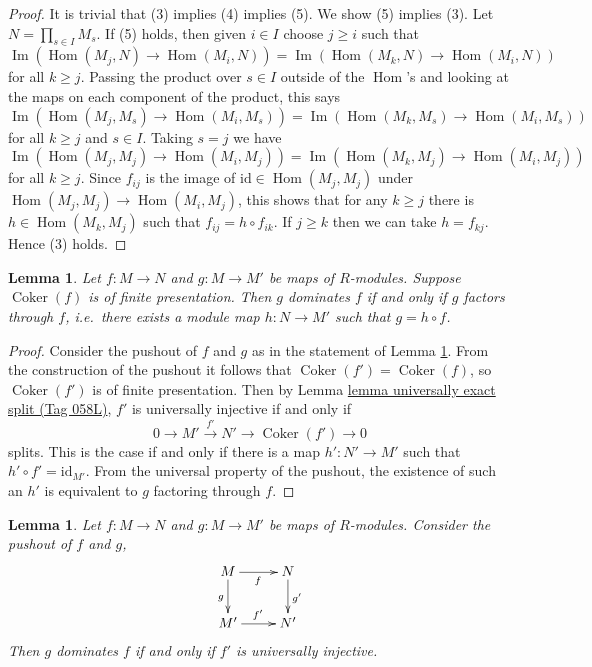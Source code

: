 \documentclass{amsart}
\theoremstyle{plain}
\newtheorem{lemma}[subsection]{Lemma}
\theoremstyle{definition}
\theoremstyle{remark}
\numberwithin{equation}{subsection}
\def\Hom{\mathop{\mathrm{Hom}}\nolimits}
\def\Im{\mathop{\mathrm{Im}}}
\def\Coker{\mathop{\mathrm{Coker}}}
\begin{document}
\begin{proof}
\medskip\noindent
It is trivial that (3) implies (4) implies (5).  We show (5) implies (3).  Let
$N = \prod_{s \in I} M_s$. If (5) holds, then given $i \in I$ choose $j \geq i$
such that
$$
\Im( \Hom(M_j, N) \to  \Hom(M_i, N)) =
\Im( \Hom(M_k, N) \to  \Hom(M_i, N))
$$
for all $k \geq j$.  Passing the product over $s \in I$ outside of the
$\Hom$'s
and looking at the maps on each component of the product, this says
$$
\Im( \Hom(M_j, M_s) \to  \Hom(M_i, M_s)) =
\Im( \Hom(M_k, M_s) \to   \Hom(M_i, M_s))
$$
for all $k \geq j$ and $s \in I$.  Taking $s = j$ we have
$$
\Im( \Hom(M_j, M_j) \to  \Hom(M_i, M_j)) =
\Im( \Hom(M_k, M_j) \to   \Hom(M_i, M_j))
$$
for all $k \geq j$.  Since $f_{ij}$ is the image of
$\text{id} \in  \Hom(M_j, M_j)$ under
$\Hom(M_j, M_j) \to  \Hom(M_i, M_j)$,
this shows  that for any $k \geq j$ there is $h \in \Hom(M_k, M_j)$
such that $f_{ij} = h \circ f_{ik}$.  If $j \geq k$ then we can take
$h = f_{kj}$. Hence (3) holds.
\end{proof}


\begin{lemma}
\label{lemma-domination}
Let $f: M \to N$ and $g: M \to M'$ be maps of $R$-modules.
Suppose $\Coker(f)$ is of finite presentation.  Then $g$ dominates $f$ if
and
only if $g$ factors through $f$, i.e.\ there exists a module map $h: N
\to M'$ such that $g = h \circ f$.
\end{lemma}

\begin{proof}
Consider the pushout of $f$ and $g$ as in the statement of
Lemma \ref{lemma-domination-universally-injective}.
From the construction of the pushout it follows that
$\Coker(f') = \Coker(f)$, so $\Coker(f')$ is of finite
presentation.  Then by
Lemma \href{https://stacks.math.columbia.edu/tag/058L}{lemma universally exact split (Tag 058L)}, $f'$ is universally injective if and
only if
$$
0 \to M' \xrightarrow{f'} N' \to \Coker(f') \to 0
$$
splits. This is the case if and only if there is a map $h' : N' \to M'$
such that $h' \circ f' = \text{id}_{M'}$.  From the universal
property of the pushout, the existence of such an $h'$ is equivalent to $g$
factoring through $f$.
\end{proof}


\begin{lemma}
\label{lemma-domination-universally-injective}
Let $f : M \to N$ and $g : M \to M'$ be maps of $R$-modules.
Consider the pushout of $f$ and $g$,
$$
\xymatrix{
M  \ar[r]_f \ar[d]_g & N \ar[d]^{g'} \\
M' \ar[r]^{f'} & N'
}
$$
Then $g$ dominates $f$ if and only if $f'$ is universally injective.
\end{lemma}
\end{document}
